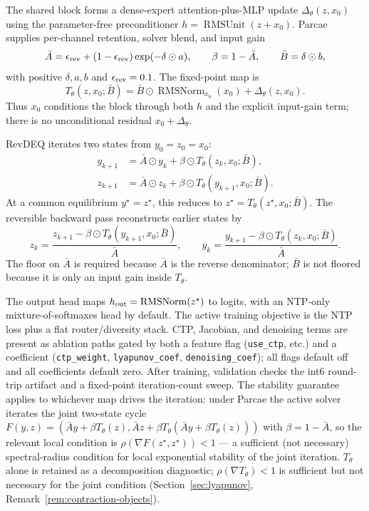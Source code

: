 \documentclass[11pt]{article}
\newcommand{\RMSUnit}{\operatorname{RMSUnit}}
\newcommand{\RMSNorm}{\operatorname{RMSNorm}}
\begin{document}
The shared block forms a dense-expert attention-plus-MLP update
$\Delta_\theta(z,x_0)$ using the parameter-free preconditioner
$h=\RMSUnit(z+x_0)$.  Parcae supplies per-channel retention, solver blend, and
input gain
\[
  \bar A=\epsilon_{\rm rev}+(1-\epsilon_{\rm rev})\exp(-\delta\odot a),
  \qquad
  \beta=1-\bar A,
  \qquad
  \bar B=\delta\odot b,
\]
with positive $\delta,a,b$ and $\epsilon_{\rm rev}=0.1$.  The fixed-point map is
\[
  T_\theta(z,x_0;\bar B)
    = \bar B\odot\RMSNorm_{x_0}(x_0)+\Delta_\theta(z,x_0).
\]
Thus $x_0$ conditions the block through both $h$ and the explicit
input-gain term; there is no unconditional residual $x_0+\Delta_\theta$.

RevDEQ iterates two states from $y_0=z_0=x_0$:
\[
\begin{aligned}
  y_{k+1} &= \bar A\odot y_k
          + \beta\odot T_\theta(z_k,x_0;\bar B),\\
  z_{k+1} &= \bar A\odot z_k
          + \beta\odot T_\theta(y_{k+1},x_0;\bar B).
\end{aligned}
\]
At a common equilibrium $y^\star=z^\star$, this reduces to
$z^\star=T_\theta(z^\star,x_0;\bar B)$.  The reversible backward pass
reconstructs earlier states by
\[
  z_k=\frac{z_{k+1}-\beta\odot T_\theta(y_{k+1},x_0;\bar B)}{\bar A},
  \qquad
  y_k=\frac{y_{k+1}-\beta\odot T_\theta(z_k,x_0;\bar B)}{\bar A}.
\]
The floor on $\bar A$ is required because $\bar A$ is the reverse denominator;
$\bar B$ is not floored because it is only an input gain inside
$T_\theta$.

The output head maps $h_{\rm out}=\RMSNorm(z^\star)$ to logits, with an
NTP-only mixture-of-softmaxes head by default.  The active training objective
is the NTP loss plus a flat router/diversity stack.  CTP, Jacobian, and
denoising terms are present as ablation paths gated by both a feature flag
(\texttt{use\_ctp}, etc.) and a coefficient (\texttt{ctp\_weight},
\texttt{lyapunov\_coef}, \texttt{denoising\_coef}); all flags default off and
all coefficients default zero.  After training, validation checks the int6 round-trip
artifact and a fixed-point iteration-count sweep.  The stability guarantee
applies to whichever map drives the iteration: under Parcae the active
solver iterates the joint two-state cycle
$F(y,z)=(\bar A y+\beta T_\theta(z),\bar A z+\beta T_\theta(\bar A y+\beta T_\theta(z)))$
with $\beta=1-\bar A$, so the relevant local condition is
$\rho(\nabla F(z^\star,z^\star))<1$ — a sufficient (not necessary)
spectral-radius condition for local exponential stability of the joint
iteration.  $T_\theta$ alone is retained as a decomposition diagnostic;
$\rho(\nabla T_\theta)<1$ is sufficient but not necessary for the joint
condition (Section~\ref{sec:lyapunov}, Remark~\ref{rem:contraction-objects}).
\end{document}
